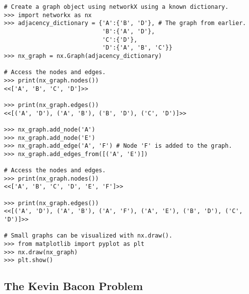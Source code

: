 \begin{lstlisting}
# Create a graph object using networkX using a known dictionary.
>>> import networkx as nx
>>> adjacency_dictionary = {'A':{'B', 'D'}, # The graph from earlier.
                            'B':{'A', 'D'},
                            'C':{'D'},
                            'D':{'A', 'B', 'C'}}
>>> nx_graph = nx.Graph(adjacency_dictionary)

# Access the nodes and edges.
>>> print(nx_graph.nodes())
<<['A', 'B', 'C', 'D']>>

>>> print(nx_graph.edges())
<<[('A', 'D'), ('A', 'B'), ('B', 'D'), ('C', 'D')]>>

>>> nx_graph.add_node('A')
>>> nx_graph.add_node('E')
>>> nx_graph.add_edge('A', 'F') # Node 'F' is added to the graph.
>>> nx_graph.add_edges_from([('A', 'E')])

# Access the nodes and edges.
>>> print(nx_graph.nodes())
<<['A', 'B', 'C', 'D', 'E', 'F']>>

>>> print(nx_graph.edges())
<<[('A', 'D'), ('A', 'B'), ('A', 'F'), ('A', 'E'), ('B', 'D'), ('C', 'D')]>>

# Small graphs can be visualized with nx.draw().
>>> from matplotlib import pyplot as plt
>>> nx.draw(nx_graph)
>>> plt.show()
\end{lstlisting}

\subsection*{The Kevin Bacon Problem} %

